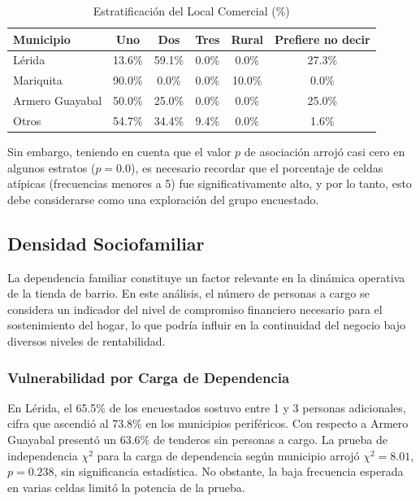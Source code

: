 \documentclass[11pt,a4paper]{article}
\begin{document}
\begin{table}[H]
\centering
\caption{Estratificación del Local Comercial (\%)}
\small
\begin{tabular}{@{}lccccc@{}}
\toprule
Municipio          & Uno     & Dos    & Tres   & Rural    & Prefiere no decir \\ \midrule
Lérida            & 13.6\%   & 59.1\%   & 0.0\%   & 0.0\%        & 27.3\% \\
Mariquita         & 90.0\%   & 0.0\%    & 0.0\%   & 10.0\%       & 0.0\% \\
Armero Guayabal   & 50.0\%   & 25.0\%   & 0.0\%   & 0.0\%        & 25.0\% \\
Otros             & 54.7\%   & 34.4\%   & 9.4\%   & 0.0\%        & 1.6\% \\ \bottomrule
\end{tabular}
\end{table}

\par
Sin embargo, teniendo en cuenta que el valor $p$ de asociación arrojó casi cero en algunos estratos ($p = 0.0$), es necesario recordar que el porcentaje de celdas atípicas (frecuencias menores a 5) fue significativamente alto, y por lo tanto, esto debe considerarse como una exploración del grupo encuestado.

\subsection{Densidad Sociofamiliar}
La dependencia familiar constituye un factor relevante en la dinámica operativa de la tienda de barrio. En este análisis, el número de personas a cargo se considera un indicador del nivel de compromiso financiero necesario para el sostenimiento del hogar, lo que podría influir en la continuidad del negocio bajo diversos niveles de rentabilidad.

\subsubsection{Vulnerabilidad por Carga de Dependencia}
En Lérida, el 65.5\% de los encuestados sostuvo entre 1 y 3 personas adicionales, cifra que ascendió al 73.8\% en los municipios periféricos. Con respecto a Armero Guayabal presentó un 63.6\% de tenderos sin personas a cargo. La prueba de independencia $\chi^{2}$ para la carga de dependencia según municipio arrojó $\chi^{2} = 8.01$, $p = 0.238$, sin significancia estadística. No obstante, la baja frecuencia esperada en varias celdas limitó la potencia de la prueba.
\end{document}
